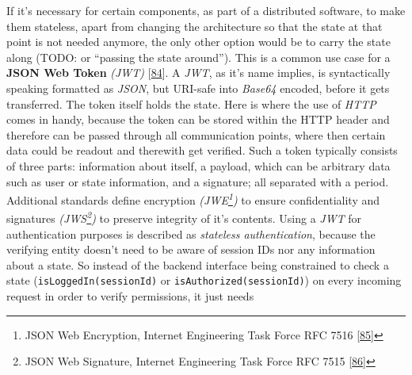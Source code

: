 \documentclass[12pt,english,a4paper,titlepage,cleardoublepage=empty,dottedtoc]{report}
\begin{document}
If it's necessary for certain components, as part of a distributed
software, to make them stateless, apart from changing the architecture
so that the state at that point is not needed anymore, the only other
option would be to carry the state along (TODO: or ``passing the state
around''). This is a common use case for a
\textbf{\protect\hypertarget{link_jwt}{}{JSON Web Token}} \emph{(JWT)}
{[}\protect\hyperlink{ref-web_spec_json-web-token}{84}{]}. A \emph{JWT},
as it's name implies, is syntactically speaking formatted as
\emph{JSON}, but URI-safe into \emph{Base64} encoded, before it gets
transferred. The token itself holds the state. Here is where the use of
\emph{HTTP} comes in handy, because the token can be stored within the
HTTP header and therefore can be passed through all communication
points, where then certain data could be readout and therewith get
verified. Such a token typically consists of three parts: information
about itself, a payload, which can be arbitrary data such as user or
state information, and a signature; all separated with a period.
Additional standards define encryption \emph{(JWE\footnote{JSON Web
  Encryption, Internet Engineering Task Force RFC 7516
  {[}\protect\hyperlink{ref-web_spec_json-web-encryption}{85}{]}})} to
ensure confidentiality and signatures \emph{(JWS\footnote{JSON Web
  Signature, Internet Engineering Task Force RFC 7515
  {[}\protect\hyperlink{ref-web_spec_json-web-signature}{86}{]}})} to
preserve integrity of it's contents. Using a \emph{JWT} for
authentication purposes is described as \emph{stateless authentication},
because the verifying entity doesn't need to be aware of session IDs nor
any information about a state. So instead of the backend interface being
constrained to check a state (\texttt{isLoggedIn(sessionId)} or
\texttt{isAuthorized(sessionId)}) on every incoming request in order to
verify permissions, it just needs
\end{document}
